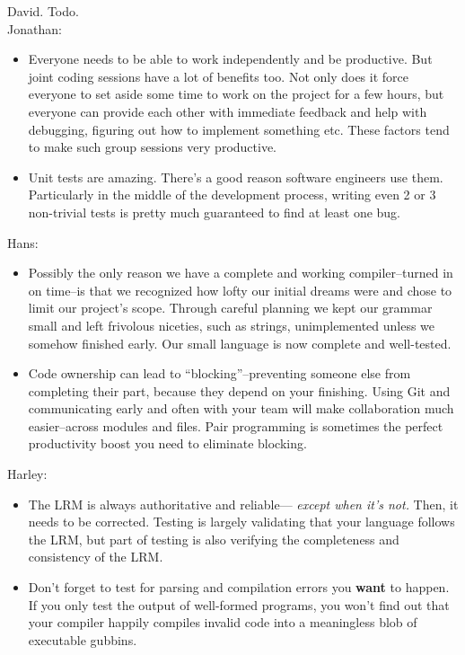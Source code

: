 David. Todo.\\

Jonathan:
\begin{itemize}
\item Everyone needs to be able to work independently and be productive. But joint coding sessions have a lot of benefits too. Not only does it force everyone to set aside some time to work on the project for a few hours, but everyone can provide each other with immediate feedback and help with debugging, figuring out how to implement something etc. These factors tend to make such group sessions very productive. 
\item Unit tests are amazing. There's a good reason software engineers use them. Particularly in the middle of the development process, writing even 2 or 3 non-trivial tests is pretty much guaranteed to find at least one bug. 
\end{itemize}

Hans:
\begin{itemize}
\item Possibly the only reason we have a complete and working compiler--turned in on time--is that we recognized how lofty our initial dreams were and chose to limit our project's scope. Through careful planning we kept our grammar small and left frivolous niceties, such as strings, unimplemented unless we somehow finished early. Our small language is now complete and well-tested.
\item Code ownership can lead to ``blocking''--preventing someone else from completing their part, because they depend on your finishing. Using Git and communicating early and often with your team will make collaboration much easier--across modules and files. Pair programming is sometimes the perfect productivity boost you need to eliminate blocking.
\end{itemize}

Harley:
\begin{itemize}
\item The LRM is always authoritative and reliable--- {\it except when it's not.} Then, it needs to be corrected. Testing is largely validating that your language follows the LRM, but part of testing is  also verifying the completeness  and consistency of the LRM. 
\item Don't forget to test for parsing and compilation errors you {\bf want} to happen. If you only test the output of well-formed programs, you won't find out that your compiler happily compiles invalid code into a meaningless blob of executable gubbins.
\end{itemize}

